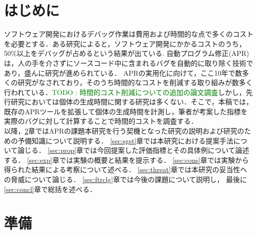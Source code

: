 \documentclass[uplatex,dvipdfmx,a4paper]{jsarticle}
\newcommand{\TODO}[1]{{\textcolor{green}{#1}}}
\let\oldcite\cite
\renewcommand{\cite}[1]{\xspace\oldcite{#1}}
\begin{document}
\section{はじめに}\label{sec:intro}
ソフトウェア開発におけるデバッグ作業は費用および時間的な点で多くのコストを必要とする．ある研究によると，ソフトウェア開発にかかるコストのうち，50\%以上をデバッグが占めるという結果が出ている\cite{5386906, Britton_reversibledebugging}.
自動プログラム修正(APR)は，人の手を介さずにソースコード中に含まれるバグを自動的に取り除く技術であり，盛んに研究が進められている\cite{gazzola2018automatic, goues2019automated}．
APRの実用化に向けて，ここ10年で数多くの研究がなされており，そのうち時間的なコストを削減する取り組みが数多く行われている\cite{id692}．\TODO{TODO : 時間的コスト削減についての追加の論文調査}しかし，先行研究においては個体の生成時間に関する研究は多くない．そこで，本稿では，既存のAPRツールを拡張して個体の生成時間を計測し，筆者が考案した指標を実際のバグに対して計算することで時間的コストを調査する．\\
以降，\ref{sec:prep}章ではAPRの課題本研究を行う契機となった研究の説明および研究のための予備知識について説明する．
\ref{sec:sgst}章では本研究における提案手法について論じる．
\ref{sec:prop}章では今回提案した評価指標とその具体例について論述する．
\ref{sec:exp}章では実験の概要と結果を提示する．
\ref{sec:cons}章では実験から得られた結果による考察について述べる．
\ref{sec:threat}章では本研究の妥当性への脅威について論じる．
\ref{sec:ftrclg}章では今後の課題について説明し，
最後に\ref{sec:concl}章で総括を述べる．

\clearpage
\section{準備}\label{sec:prep}
\end{document}
